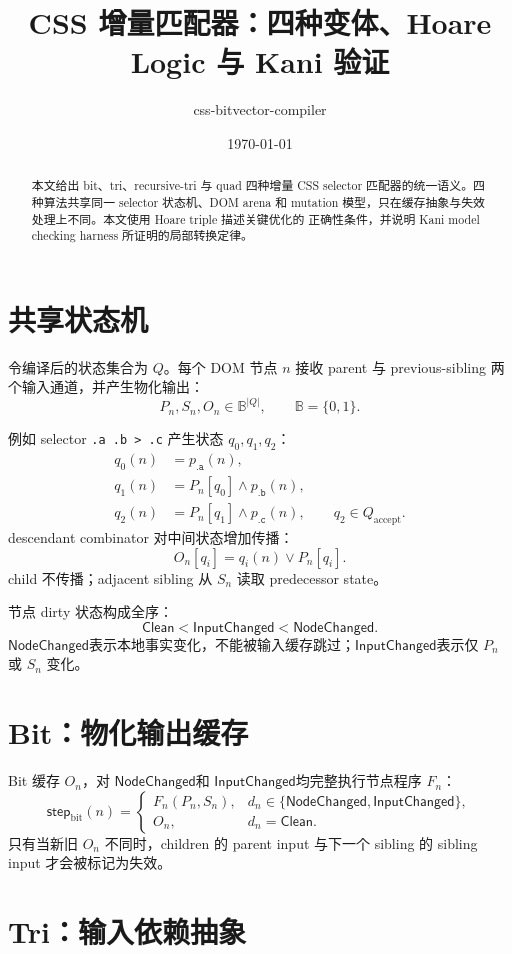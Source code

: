 \documentclass[UTF8,11pt]{ctexart}
\title{CSS 增量匹配器：四种变体、Hoare Logic 与 Kani 验证}
\author{css-bitvector-compiler}
\date{\today}
\newcommand{\Bool}{\ensuremath{\mathbb{B}}}
\newcommand{\Clean}{\ensuremath{\mathsf{Clean}}}
\newcommand{\InputChanged}{\ensuremath{\mathsf{InputChanged}}}
\newcommand{\NodeChanged}{\ensuremath{\mathsf{NodeChanged}}}
\begin{document}
\maketitle

\begin{abstract}
本文给出 bit、tri、recursive-tri 与 quad 四种增量 CSS selector
匹配器的统一语义。四种算法共享同一 selector 状态机、DOM arena 和 mutation
模型，只在缓存抽象与失效处理上不同。本文使用 Hoare triple 描述关键优化的
正确性条件，并说明 Kani model checking harness 所证明的局部转换定律。
\end{abstract}

\section{共享状态机}

令编译后的状态集合为 $Q$。每个 DOM 节点 $n$ 接收 parent 与 previous-sibling
两个输入通道，并产生物化输出：
\[
P_n,S_n,O_n\in\Bool^{|Q|},\qquad \Bool=\{0,1\}.
\]

例如 selector \texttt{.a .b > .c} 产生状态 $q_0,q_1,q_2$：
\[
\begin{aligned}
q_0(n)&=p_{\mathtt{.a}}(n),\\
q_1(n)&=P_n[q_0]\land p_{\mathtt{.b}}(n),\\
q_2(n)&=P_n[q_1]\land p_{\mathtt{.c}}(n),
\qquad q_2\in Q_{\mathrm{accept}}.
\end{aligned}
\]
descendant combinator 对中间状态增加传播：
\[
O_n[q_i]=q_i(n)\lor P_n[q_i].
\]
child 不传播；adjacent sibling 从 $S_n$ 读取 predecessor state。

节点 dirty 状态构成全序：
\[
\Clean<\InputChanged<\NodeChanged.
\]
\NodeChanged 表示本地事实变化，不能被输入缓存跳过；\InputChanged 表示仅
$P_n$ 或 $S_n$ 变化。

\section{Bit：物化输出缓存}

Bit 缓存 $O_n$，对 \NodeChanged 和 \InputChanged 均完整执行节点程序 $F_n$：
\[
\mathsf{step}_{\mathrm{bit}}(n)=
\begin{cases}
F_n(P_n,S_n),&d_n\in\{\NodeChanged,\InputChanged\},\\
O_n,&d_n=\Clean.
\end{cases}
\]
只有当新旧 $O_n$ 不同时，children 的 parent input 与下一个 sibling 的
sibling input 才会被标记为失效。

\section{Tri：输入依赖抽象}
\end{document}
